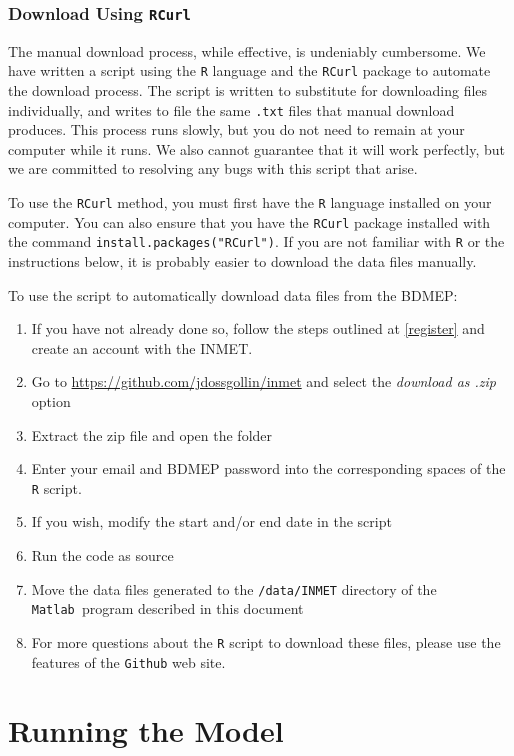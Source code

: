 \documentclass[11pt]{article} %
\newcommand{\fn}[1]{\texttt{#1}} %
\newcommand{\code}[1]{\texttt{#1}} %
\newcommand{\mtlb}{\texttt{Matlab\ }}
\newcommand{\usee}[1]{\textit{#1}} %
\begin{document}
\subsubsection{Download Using \code{RCurl}}

The manual download process, while effective, is undeniably cumbersome.
We have written a script using the \code{R} language and the  \code{RCurl} package to automate the download process.
The script is written to substitute for downloading files individually, and writes to file the same \code{.txt} files that manual download produces.
This process runs slowly, but you do not need to remain at your computer while it runs.
We also cannot guarantee that it will work perfectly, but we are committed to resolving any bugs with this script that arise.

To use the \code{RCurl} method, you must first have the \code{R} language installed on your computer. You can also ensure that you have the \code{RCurl} package installed with the command \code{install.packages("RCurl")}. If you are not familiar with \code{R} or the instructions below, it is probably easier to download the data files manually.

To use the script to automatically download data files from the \ac{BDMEP}:

\begin{enumerate}
\item If you have not already done so, follow the steps outlined at \cref{register} and create an account with the \ac{INMET}.
\item Go to \url{https://github.com/jdossgollin/inmet} and select the \usee{download as .zip} option
\item Extract the zip file and open the folder
\item Enter your email and \ac{BDMEP} password into the corresponding spaces of the \code{R} script.
\item If you wish, modify the start and/or end date in the script
\item Run the code as source
\item Move the data files generated to the \fn{/data/INMET} directory of the \mtlb program described in this document
\item For more questions about the \code{R} script to download these files, please use the features of the \fn{Github} web site.
\end{enumerate}


\section{Running the Model}
\end{document}
